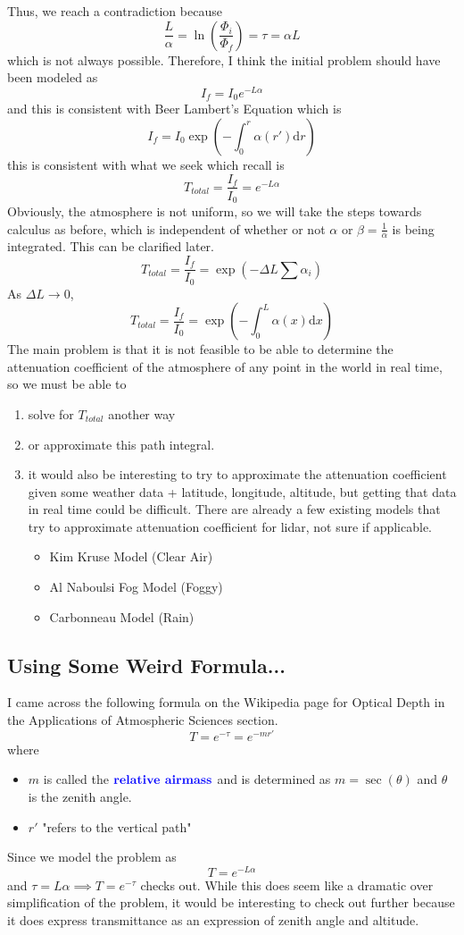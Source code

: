 \documentclass[12pt]{scrartcl}
\begin{document}
Thus, we reach a contradiction because
\[\frac{L}{\alpha} = \ln(\frac{\Phi_i}{\Phi_f}) = \tau = \alpha L\]
which is not always possible. Therefore, I think the initial problem should
have been modeled as \[I_f = I_0e^{-L\alpha}\]
and this is consistent with Beer Lambert's Equation which is
\[I_f = I_0\exp(-\int_0^r \alpha(r')\text{d}r)\]
this is consistent with what we seek which recall is
\[T_{total} = \frac{I_f}{I_0} = e^{-L\alpha}\]
Obviously, the atmosphere is not uniform, so we will take the steps towards
calculus as before, which is independent of whether or not $\alpha$ or $\beta =
    \frac{1}{\alpha}$ is being integrated. This can be clarified later.
\[T_{total} = \frac{I_f}{I_0} = \exp({-\Delta L \sum \alpha_i})\]
As $\Delta L \to 0$,
\[T_{total} = \frac{I_f}{I_0} = \exp(-\int_0^L \alpha(x) \text{d}x)\]
The main problem is that it is not feasible to be able to determine the
attenuation coefficient of the atmosphere of any point in the world in real
time, so we must be able to
\begin{enumerate}
    \item solve for $T_{total}$ another way
    \item or approximate this path integral.
    \item it would also be interesting to try to approximate the attenuation coefficient
          given some weather data + latitude, longitude, altitude, but getting that data
          in real time could be difficult. There are already a few existing models that
          try to approximate attenuation coefficient for lidar, not sure if applicable.
          \begin{itemize}
              \item Kim Kruse Model (Clear Air)
              \item Al Naboulsi Fog Model (Foggy)
              \item Carbonneau Model (Rain)

          \end{itemize}
\end{enumerate}

\subsection{Using Some Weird Formula...}

I came across the following formula on the Wikipedia page for Optical Depth in
the Applications of Atmospheric Sciences section.
\[T = e^{-\tau} = e^{-mr'}\]
where
\begin{itemize}
    \item $m$ is called the $\textbf{\color{blue} relative airmass}$ and is determined as $m = \sec(\theta)$ and $\theta$ is the zenith angle.
    \item $r'$ "refers to the vertical path"
\end{itemize}
Since we model the problem as
\[T = e^{-L\alpha}\] and $\tau = L\alpha \implies T = e^{-\tau}$ checks out. While this does seem
like a dramatic over simplification of the problem, it would be interesting to
check out further because it does express transmittance as an expression of
zenith angle and altitude.
\end{document}
